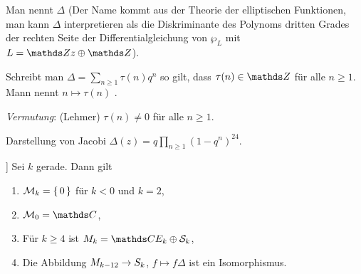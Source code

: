 \begin{beme-list}
	\item Man nennt $\Delta$  (Der Name kommt aus der Theorie der elliptischen Funktionen, man kann $\Delta$ interpretieren als die Diskriminante des Polynoms dritten Grades der rechten Seite der Differentialgleichung von $\wp_L$ mit $L = \ZZ z \oplus \ZZ$).
	
	\item Schreibt man $\Delta = \sum_{n \geq 1} \tau(n) q^n$ so gilt, dass $\tau(n) \in \ZZ$ für alle $n \geq 1$.
	Mann nennt $n \mapsto \tau(n)$ .
	
	\emph{Vermutung}: (Lehmer) $\tau(n) \not= 0$ für alle $n \geq 1$.
	
	\item Darstellung von Jacobi $\Delta(z) = q\prod_{n \geq 1} (1-q^n)^{24}$.
\end{beme-list}

\begin{koro}\label{koro:Mk}]
	Sei $k$ gerade.
	Dann gilt
	\begin{enumerate}
		\item $\mathcal{M}_k = \left\{\,0\,\right\}$ für $k < 0$ und $k=2$,
		\item $\M_0 = \CC$,
		\item Für $k \geq 4$ ist $M_k = \CC E_k \oplus \mathcal{S}_k$,
		\item Die Abbildung $M_{k-12} \rightarrow S_{k}$, $f \mapsto f\Delta$ ist ein Isomorphismus.
	\end{enumerate}
\end{koro}

